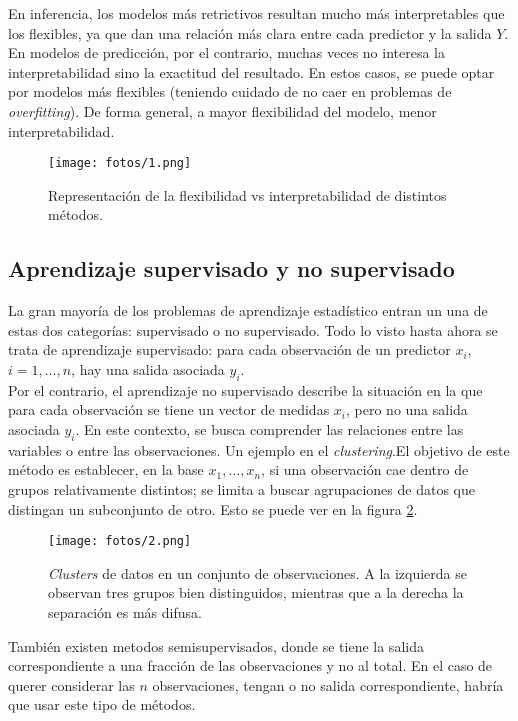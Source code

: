 En inferencia, los modelos más retrictivos resultan mucho más interpretables que los flexibles, ya que dan una relación más clara entre cada predictor y la salida $Y$. En modelos de predicción, por el contrario, muchas veces no interesa la interpretabilidad sino la exactitud del resultado. En estos casos, se puede optar por modelos más flexibles (teniendo cuidado de no caer en problemas de \textit{overfitting}). De forma general, a mayor flexibilidad del modelo, menor interpretabilidad. 

\begin{figure}[h]
\centering
\texttt{[image: fotos/1.png]}
\caption{Representación de la flexibilidad vs interpretabilidad de distintos métodos.}
\label{fig:1}
\end{figure}

\subsection{Aprendizaje supervisado y no supervisado}

La gran mayoría de los problemas de aprendizaje estadístico entran un una de estas dos categorías: supervisado o no supervisado. Todo lo visto hasta ahora se trata de aprendizaje supervisado: para cada observación de un predictor $x_i$, $i = 1, \dots, n$, hay una salida asociada $y_i$. \\

Por el contrario, el aprendizaje no supervisado describe la situación en la que para cada observación se tiene un vector de medidas $x_i$, pero no una salida asociada $y_i$. En este contexto, se busca comprender las relaciones entre las variables o entre las observaciones. Un ejemplo en el \textit{clustering}.El objetivo de este método es establecer, en la base $x_1, \dots, x_n$, si una observación cae dentro de grupos relativamente distintos; se limita a buscar agrupaciones de datos que distingan un subconjunto de otro. Esto se puede ver en la figura \ref{fig:2}.

\begin{figure}[h]
\centering
\texttt{[image: fotos/2.png]}
\caption{\textit{Clusters} de datos en un conjunto de observaciones. A la izquierda se observan tres grupos bien distinguidos, mientras que a la derecha la separación es más difusa.}
\label{fig:2}
\end{figure}

También existen metodos semisupervisados, donde se tiene la salida correspondiente a una fracción de las observaciones y no al total. En el caso de querer considerar las $n$ observaciones, tengan o no salida correspondiente, habría que usar este tipo de métodos. 

